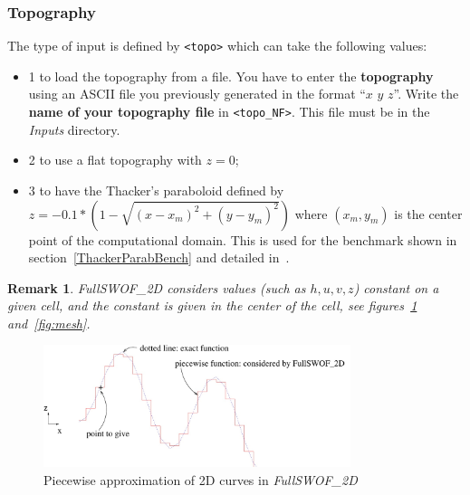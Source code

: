 \documentclass[a4paper, 11pt]{article}
\newcommand{\FullSWOF}{\emph{FullSWOF\_2D}}
\newtheorem{rmk}{Remark}
\begin{document}
\begin{itemize}
\begin{itemize}
\end{itemize}
\end{itemize}

\subsubsection{Topography}
The type of input is defined by \texttt{<topo>} which can take the following values:
\begin{itemize}
	\item 1 to load the topography from a file. You have to enter the \textbf{topography} using an ASCII file you previously generated in the format  ``$x$ $y$ $z$''.
	Write the \textbf{name of your topography file} in \texttt{<topo\_NF>}. This file must be in the \textit{Inputs} directory. 
	\item 2 to use a flat topography with $z=0$; 
	\item 3 to have the Thacker's paraboloid defined by $z=-0.1*(1-\sqrt{(x-x_m)^2+(y-y_m)^2})$ where $(x_m,y_m)$ is the center point of the computational domain. This is used for the benchmark shown in section~\ref{ThackerParabBench} and detailed in~\citep[§~4.2.2]{Delestre13}. 
\end{itemize}
\begin{rmk}
\FullSWOF{} considers values (such as $h, u, v, z$) constant on a given cell, and the constant 
is given in the center of the cell, see figures~\ref{fig:cells} and~\ref{fig:mesh}.
\end{rmk}

\begin{figure}[htbp]
\begin{center}
\includegraphics[width=0.8\textwidth]{Figures_FullSWOF_2D/points-cells_2D}
\caption{Piecewise approximation of 2D curves in \FullSWOF{}}
\label{fig:cells}
\end{center}
\end{figure}
\end{document}
